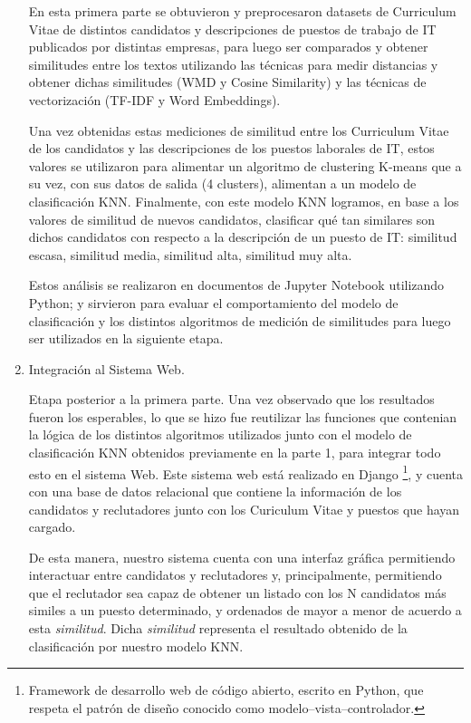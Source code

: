 \documentclass[12pt,a4paper]{article}
\begin{document}
\begin{sloppypar}
\begin{enumerate}
En esta primera parte se obtuvieron y preprocesaron datasets de Curriculum Vitae de distintos candidatos y descripciones de puestos de trabajo de IT publicados por distintas empresas, para luego ser comparados y obtener similitudes entre los textos utilizando las técnicas para medir distancias y obtener dichas similitudes (WMD y Cosine Similarity) y las técnicas de vectorización (TF-IDF y Word Embeddings).

Una vez obtenidas estas mediciones de similitud entre los Curriculum Vitae de los candidatos y las descripciones de los puestos laborales de IT, estos valores se utilizaron para alimentar un algoritmo de clustering K-means que a su vez, con sus datos de salida (4 clusters), alimentan a un modelo de clasificación KNN. Finalmente, con este modelo KNN logramos, en base a los valores de similitud de nuevos candidatos, clasificar qué tan similares son dichos candidatos con respecto a la descripción de un puesto de IT: similitud escasa, similitud media, similitud alta, similitud muy alta.

Estos análisis se realizaron en documentos de Jupyter Notebook utilizando Python; y sirvieron para evaluar el comportamiento del modelo de clasificación y los distintos algoritmos de medición de similitudes para luego ser utilizados en la siguiente etapa. \\

\item Integración al Sistema Web. 

Etapa posterior a la primera parte. Una vez observado que los resultados fueron los esperables, lo que se hizo fue reutilizar las funciones que contenian la lógica de los distintos algoritmos utilizados junto con el modelo de clasificación KNN obtenidos previamente en la parte 1, para integrar todo esto en el sistema Web. Este sistema web está realizado en Django \footnote{Framework de desarrollo web de código abierto, escrito en Python, que respeta el patrón de diseño conocido como modelo–vista–controlador.}, y cuenta con una base de datos relacional que contiene la información de los candidatos y reclutadores junto con los Curiculum Vitae y puestos que hayan cargado. 

De esta manera, nuestro sistema cuenta con una interfaz gráfica permitiendo interactuar entre candidatos y reclutadores y, principalmente, permitiendo que el reclutador sea capaz de obtener un listado con los N candidatos más similes a un puesto determinado, y ordenados de mayor a menor de acuerdo a esta \textit{similitud}. Dicha \textit{similitud} representa el resultado obtenido de la clasificación por nuestro modelo KNN.


\end{enumerate}
\end{sloppypar}
\end{document}
